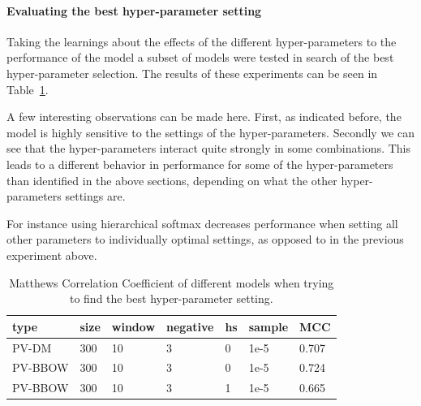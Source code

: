 
\paragraph{Evaluating the best hyper-parameter setting}

Taking the learnings about the effects of the different hyper-parameters to the performance of the model a subset of models were tested in search of the best hyper-parameter selection. The results of these experiments can be seen in Table~\ref{tab:Paragraph Vector Parameter Results Best}.

A few interesting observations can be made here. First, as indicated before, the model is highly sensitive to the settings of the hyper-parameters. Secondly we can see that the hyper-parameters interact quite strongly in some combinations. This leads to a different behavior in performance for some of the hyper-parameters than identified in the above sections, depending on what the other hyper-parameters settings are.

For instance using hierarchical softmax decreases performance when setting all other parameters to individually optimal settings, as opposed to in the previous experiment above.

\begin{table}[h]
  \begin{center}
  \begin{tabular}{ *6l | l }
    \toprule
    type & size & window & negative & hs & sample & MCC  \\
    \midrule
    PV-DM & 300 & 10 & 3 & 0 & 1e-5 & 0.707 \\
    PV-BBOW & 300 & 10 & 3 & 0 & 1e-5 & 0.724 \\
    PV-BBOW & 300 & 10 & 3 & 1 & 1e-5 & 0.665 \\
    \bottomrule
  \end{tabular}
  \caption{Matthews Correlation Coefficient of different models when trying to find the best hyper-parameter setting.}
\label{tab:Paragraph Vector Parameter Results Best}
\end{center}
\end{table}


%

